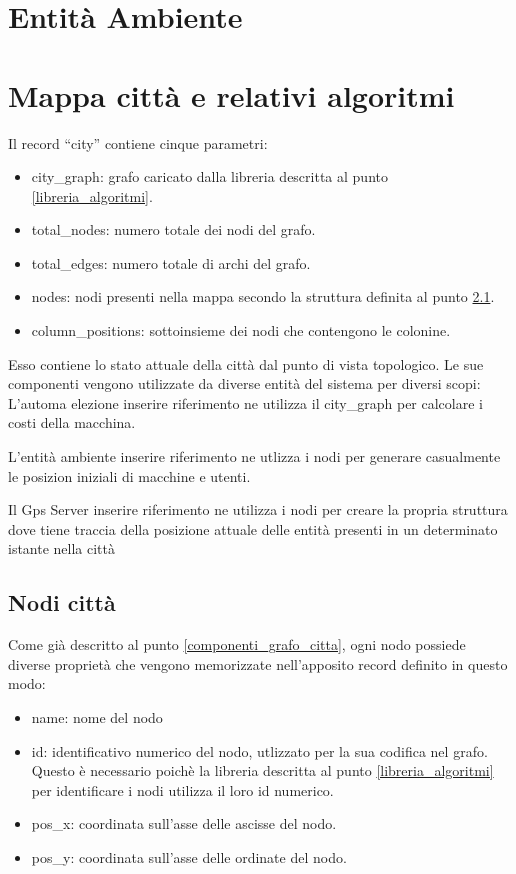 \section{Entità Ambiente}

\section{Mappa città e relativi algoritmi}
Il record ``city'' contiene cinque parametri:
\begin{itemize}
	\item city\_graph: grafo caricato dalla libreria descritta al punto \ref{libreria_algoritmi}.
	\item total\_nodes: numero totale dei nodi del grafo.
	\item total\_edges: numero totale di archi del grafo.
	\item nodes: nodi presenti nella mappa secondo la struttura definita al punto \ref{nodi_citta}.
	\item column\_positions: sottoinsieme dei nodi che contengono le colonine.
\end{itemize}

Esso contiene lo stato attuale della città dal punto di vista topologico. Le sue componenti vengono utilizzate da diverse entità del sistema per diversi scopi:
L'automa elezione inserire riferimento ne utilizza il city\_graph per calcolare i costi della macchina.

L'entità ambiente inserire riferimento ne utlizza i nodi per generare casualmente le posizion iniziali di macchine e utenti.

Il Gps Server inserire riferimento ne utilizza i nodi per creare la propria struttura dove tiene traccia della posizione attuale delle entità presenti in un determinato istante nella città


\subsection{Nodi città}\label{nodi_citta}
Come già descritto al punto \ref{componenti_grafo_citta}, ogni nodo possiede diverse proprietà che vengono memorizzate nell'apposito record definito in questo modo:
\begin{itemize}
	\item name: nome del nodo
	\item id: identificativo numerico del nodo, utlizzato per la sua codifica nel grafo. Questo è necessario poichè la libreria descritta al punto \ref{libreria_algoritmi} per identificare i nodi utilizza il loro id numerico.
	\item pos\_x: coordinata sull'asse delle ascisse del nodo.
	\item pos\_y: coordinata sull'asse delle ordinate del nodo.
\end{itemize}

